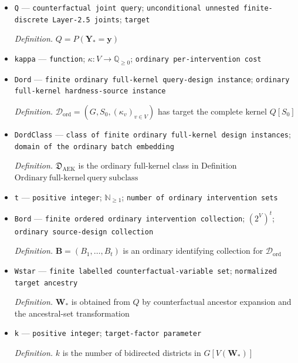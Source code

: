 \documentclass{article}
\begin{document}
\begin{itemize}
  \par\smallskip\noindent\emph{Definition.} \(Q[S_0]=\{P_{\operatorname{do}(V\setminus S_0=x)}(S_0=s):x\in\mathfrak X_{V\setminus S_0},\ s\in\mathfrak X_{S_0}\}\)
  \item \texttt{Q} --- \texttt{counterfactual joint query}; \texttt{unconditional unnested finite-\allowbreak{}discrete Layer-\allowbreak{}2.5 joints}; \texttt{target}
  \par\smallskip\noindent\emph{Definition.} \(Q=P(\mathbf Y_{\ast}=\mathbf y)\)
  \item \texttt{kappa} --- \texttt{function}; \(\kappa:V\to\mathbb Q_{\ge0}\); \texttt{ordinary per-\allowbreak{}intervention cost}
  \item \texttt{Dord} --- \texttt{finite ordinary full-\allowbreak{}kernel query-\allowbreak{}design instance}; \texttt{ordinary full-\allowbreak{}kernel hardness-\allowbreak{}source instance}
  \par\smallskip\noindent\emph{Definition.} \(\mathcal D_{\mathrm{ord}}=(G,S_0,(\kappa_v)_{v\in V})\) has target the complete kernel \(Q[S_0]\)
  \item \texttt{DordClass} --- \texttt{class of finite ordinary full-\allowbreak{}kernel design instances}; \texttt{domain of the ordinary batch embedding}
  \par\smallskip\noindent\emph{Definition.} \(\mathfrak D_{\mathrm{AEK}}\) is the ordinary full-kernel class in Definition \(\mathrm{Ordinary\ full\mbox{-}kernel\ query\ subclass}\)
  \item \texttt{t} --- \texttt{positive integer}; \(\mathbb N_{\ge 1}\); \texttt{number of ordinary intervention sets}
  \item \texttt{Bord} --- \texttt{finite ordered ordinary intervention collection}; \((2^V)^t\); \texttt{ordinary source-\allowbreak{}design collection}
  \par\smallskip\noindent\emph{Definition.} \(\mathbf B=(B_1,\ldots,B_t)\) is an ordinary identifying collection for \(\mathcal D_{\mathrm{ord}}\)
  \item \texttt{Wstar} --- \texttt{finite labelled counterfactual-\allowbreak{}variable set}; \texttt{normalized target ancestry}
  \par\smallskip\noindent\emph{Definition.} \(\mathbf W_{\ast}\) is obtained from \(Q\) by counterfactual ancestor expansion and the ancestral-set transformation
  \item \texttt{k} --- \texttt{positive integer}; \texttt{target-\allowbreak{}factor parameter}
  \par\smallskip\noindent\emph{Definition.} \(k\) is the number of bidirected districts in \(G[V(\mathbf W_{\ast})]\)

\end{itemize}
\end{document}
